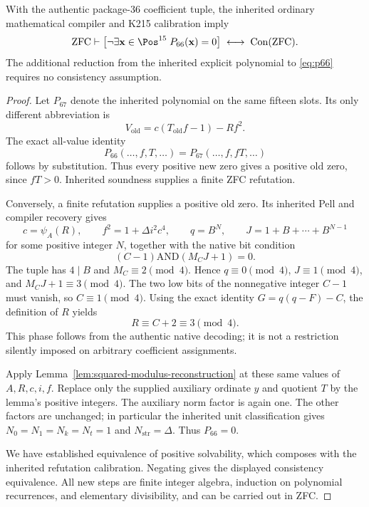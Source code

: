 \begin{theorem}
\label{thm:p66-consistency}
With the authentic package-36 coefficient tuple, the inherited ordinary
mathematical compiler and K215 calibration imply
\[
 \mathrm{ZFC}\vdash
 \left[
 \neg\exists\mathbf{x}\in\Pos^{15}\;P_{66}(\mathbf{x})=0
 \right]
 \;\longleftrightarrow\;
 \operatorname{Con}(\mathrm{ZFC}).
\]
The additional reduction from the inherited explicit polynomial to
\eqref{eq:p66} requires no consistency assumption.
\end{theorem}

\begin{proof}
Let \(P_{67}\) denote the inherited polynomial on the same fifteen slots.
Its only different abbreviation is
\[
 V_{\mathrm{old}}=c(T_{\mathrm{old}}f-1)-Rf^2.
\]
The exact all-value identity
\begin{equation}
 P_{66}(\ldots,f,T,\ldots)
   =P_{67}(\ldots,f,fT,\ldots)
 \label{eq:p66-pullback}
\end{equation}
follows by substitution.  Thus every positive new zero gives a positive old
zero, since \(fT>0\).  Inherited soundness supplies a finite ZFC refutation.

Conversely, a finite refutation supplies a positive old zero.  Its inherited
Pell and compiler recovery gives
\[
 c=\psi_A(R),\qquad f^2=1+\Delta i^2c^4,
 \qquad q=B^N,\qquad J=1+B+\cdots+B^{N-1}
\]
for some positive integer \(N\), together with the native bit condition
\[
 (C-1)\mathbin{\mathrm{AND}}(M_CJ+1)=0.
\]
The tuple has \(4\mid B\) and \(M_C\equiv2\pmod4\).  Hence
\(q\equiv0\pmod4\), \(J\equiv1\pmod4\), and
\(M_CJ+1\equiv3\pmod4\).  The two low bits of the nonnegative integer
\(C-1\) must vanish, so \(C\equiv1\pmod4\).  Using the exact identity
\(G=q(q-F)-C\), the definition of \(R\) yields
\[
 R\equiv C+2\equiv3\pmod4.
\]
This phase follows from the authentic native decoding; it is not a
restriction silently imposed on arbitrary coefficient assignments.

Apply Lemma~\ref{lem:squared-modulus-reconstruction} at these same values
of \(A,R,c,i,f\).  Replace only the supplied auxiliary ordinate \(y\) and
quotient \(T\) by the lemma's positive integers.  The auxiliary norm factor
is again one.  The other factors are unchanged; in particular the inherited
unit classification gives \(N_0=N_1=N_k=N_t=1\) and
\(N_{\mathrm{str}}=\Delta\).  Thus \(P_{66}=0\).

We have established equivalence of positive solvability, which composes
with the inherited refutation calibration.  Negating gives the displayed
consistency equivalence.  All new steps are finite integer algebra,
induction on polynomial recurrences, and elementary divisibility, and can
be carried out in ZFC.
\end{proof}

